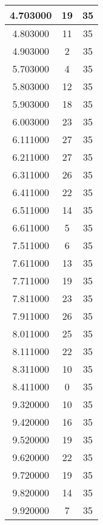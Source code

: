 \begin{longtable}[htbp]{|c|c|c|}
4.703000 & 19 & 35 \\ \hline
4.803000 & 11 & 35 \\ \hline
4.903000 & 2 & 35 \\ \hline
5.703000 & 4 & 35 \\ \hline
5.803000 & 12 & 35 \\ \hline
5.903000 & 18 & 35 \\ \hline
6.003000 & 23 & 35 \\ \hline
6.111000 & 27 & 35 \\ \hline
6.211000 & 27 & 35 \\ \hline
6.311000 & 26 & 35 \\ \hline
6.411000 & 22 & 35 \\ \hline
6.511000 & 14 & 35 \\ \hline
6.611000 & 5 & 35 \\ \hline
7.511000 & 6 & 35 \\ \hline
7.611000 & 13 & 35 \\ \hline
7.711000 & 19 & 35 \\ \hline
7.811000 & 23 & 35 \\ \hline
7.911000 & 26 & 35 \\ \hline
8.011000 & 25 & 35 \\ \hline
8.111000 & 22 & 35 \\ \hline
8.311000 & 10 & 35 \\ \hline
8.411000 & 0 & 35 \\ \hline
9.320000 & 10 & 35 \\ \hline
9.420000 & 16 & 35 \\ \hline
9.520000 & 19 & 35 \\ \hline
9.620000 & 22 & 35 \\ \hline
9.720000 & 19 & 35 \\ \hline
9.820000 & 14 & 35 \\ \hline
9.920000 & 7 & 35 \\ \hline
\end{longtable}
